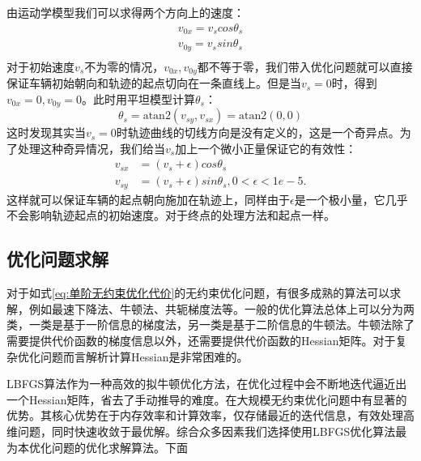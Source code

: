 \documentclass[master,academic]{ysuthesis} %
\begin{document}
		由运动学模型我们可以求得两个方向上的速度：
		\begin{equation}
			\begin{aligned}
				v_{0x}=v_scos\theta _s\\
				v_{0y}=v_ssin\theta _s\\
			\end{aligned}
		\end{equation}
		对于初始速度$v_s$不为零的情况，$v_{0x},v_{0y}$都不等于零，我们带入优化问题就可以直接保证车辆初始朝向和轨迹的起点切向在一条直线上。但是当$v_{s}=0$时，得到$v_{0x}=0,v_{0y}=0$。此时用平坦模型计算$\theta_s$：
		\begin{equation}
			\theta_s=\text{atan}2\left( v_{sy},v_{sx} \right) =\text{atan}2\left( 0,0 \right) 
		\end{equation}
		这时发现其实当$v_{s}=0$时轨迹曲线的切线方向是没有定义的，这是一个奇异点。为了处理这种奇异情况，我们给当$v_{s}$加上一个微小正量保证它的有效性：
		\begin{equation}
			\begin{aligned}
			v_{sx}&=\left( v_s+\epsilon \right) cos\theta_s\\
			v_{sy}&=\left( v_s+\epsilon \right) sin\theta_s,0<\epsilon <1e-5.
			\end{aligned}
		\end{equation}
		这样就可以保证车辆的起点朝向施加在轨迹上，同样由于$\epsilon$是一个极小量，它几乎不会影响轨迹起点的初始速度。对于终点的处理方法和起点一样。

		\subsection{优化问题求解}
		对于如式\ref{eq:单阶无约束优化代价}的无约束优化问题，有很多成熟的算法可以求解，例如最速下降法、牛顿法、共轭梯度法等。一般的优化算法总体上可以分为两类，一类是基于一阶信息的梯度法，另一类是基于二阶信息的牛顿法。牛顿法除了需要提供代价函数的梯度信息以外，还需要提供代价函数的Hessian矩阵。对于复杂优化问题而言解析计算Hessian是非常困难的。
		
		LBFGS算法作为一种高效的拟牛顿优化方法，在优化过程中会不断地迭代逼近出一个Hessian矩阵，省去了手动推导的难度\cite{liu1989limited}。在大规模无约束优化问题中有显著的优势。其核心优势在于内存效率和计算效率，仅存储最近的迭代信息，有效处理高维问题，同时快速收敛于最优解。综合众多因素我们选择使用LBFGS优化算法最为本优化问题的优化求解算法。下面
\end{document}
